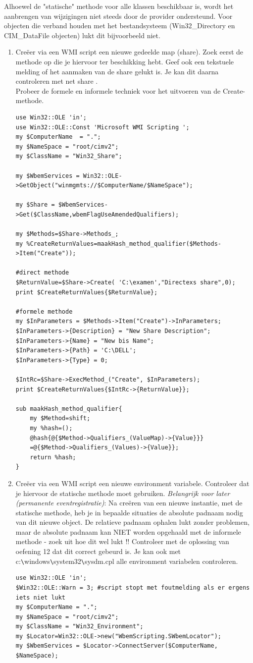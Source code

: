 \documentclass[11pt,a4paper]{report}
\begin{document}
Alhoewel de "statische" methode voor alle klassen beschikbaar is, wordt het aanbrengen van wijzigingen niet steeds door de provider ondersteund. Voor objecten die verband houden met het bestandsysteem (Win32\_Directory en CIM\_DataFile objecten) lukt dit bijvoorbeeld niet.
\begin{enumerate}[resume]
	\item Creëer via een WMI script een nieuwe gedeelde map (share). Zoek eerst de methode op die je hiervoor ter beschikking hebt. Geef ook een tekstuele melding of het aanmaken van de share gelukt is. Je kan dit daarna controleren met net share .
	\\Probeer de formele en informele techniek voor het uitvoeren van de Create-methode.
	\begin{lstlisting}
use Win32::OLE 'in';
use Win32::OLE::Const 'Microsoft WMI Scripting ';
my $ComputerName  = ".";
my $NameSpace = "root/cimv2";
my $ClassName = "Win32_Share";

my $WbemServices = Win32::OLE->GetObject("winmgmts://$ComputerName/$NameSpace");

my $Share = $WbemServices->Get($ClassName,wbemFlagUseAmendedQualifiers);

my $Methods=$Share->Methods_;
my %CreateReturnValues=maakHash_method_qualifier($Methods->Item("Create"));

#direct methode
$ReturnValue=$Share->Create( 'C:\examen',"Directexs share",0);
print $CreateReturnValues{$ReturnValue};

#formele methode
my $InParameters = $Methods->Item("Create")->InParameters;
$InParameters->{Description} = "New Share Description";
$InParameters->{Name} = "New bis Name";
$InParameters->{Path} = 'C:\DELL';
$InParameters->{Type} = 0;

$IntRc=$Share->ExecMethod_("Create", $InParameters);
print $CreateReturnValues{$IntRc->{ReturnValue}};

sub maakHash_method_qualifier{
	my $Method=shift;
	my %hash=();
	@hash{@{$Method->Qualifiers_(ValueMap)->{Value}}}
	=@{$Method->Qualifiers_(Values)->{Value}};
	return %hash;
}
	\end{lstlisting}
	\item Creëer via een WMI script een nieuwe environment variabele. Controleer dat je hiervoor de statische methode moet gebruiken.
	\textit{Belangrijk voor later (permanente eventregistratie)}: Na creëren van een nieuwe instantie, met de statische methode, heb je in bepaalde situaties de absolute padnaam nodig van dit nieuwe object. De relatieve padnaam ophalen lukt zonder problemen, maar de absolute padnaam kan NIET worden opgehaald met de informele methode - zoek uit hoe dit wel lukt !!
	Controleer met de oplossing van oefening 12 dat dit correct gebeurd is. Je kan ook met c:\verb+\+windows\verb+\+system32\verb+\+sysdm.cpl alle environment variabelen controleren.
	\begin{lstlisting}
use Win32::OLE 'in';
$Win32::OLE::Warn = 3; #script stopt met foutmelding als er ergens iets niet lukt
my $ComputerName = ".";
my $NameSpace = "root/cimv2";
my $ClassName = "Win32_Environment";
my $Locator=Win32::OLE->new("WbemScripting.SWbemLocator");
my $WbemServices = $Locator->ConnectServer($ComputerName, $NameSpace);


\end{lstlisting}
\end{enumerate}
\end{document}
